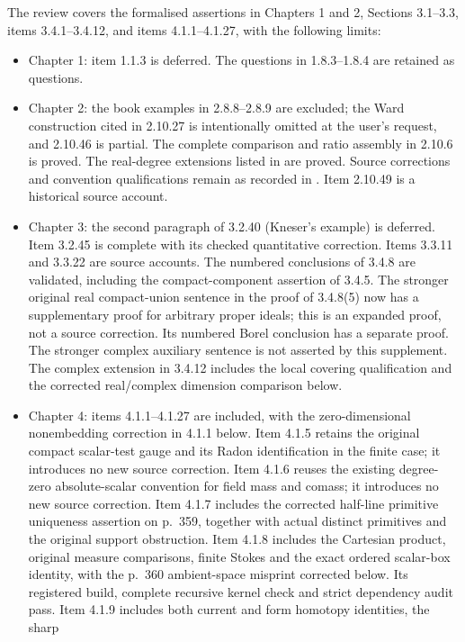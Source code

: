 \documentclass[11pt]{article}
\begin{document}
The review covers the formalised assertions in Chapters 1 and 2,
Sections 3.1--3.3, items 3.4.1--3.4.12, and items 4.1.1--4.1.27, with the following limits:
\begin{itemize}
\item Chapter 1: item 1.1.3 is deferred. The questions in 1.8.3--1.8.4
are retained as questions.
\item Chapter 2: the book examples in 2.8.8--2.8.9 are excluded;
the Ward construction cited in 2.10.27 is intentionally omitted at the
user's request, and 2.10.46 is partial. The complete comparison and ratio assembly in 2.10.6 is proved. The real-degree extensions listed in
 are proved. Source corrections and
convention qualifications remain as recorded in
. Item 2.10.49 is a historical source account.
\item Chapter 3: the second paragraph of 3.2.40 (Kneser's example) is
deferred. Item 3.2.45 is complete with its checked quantitative
correction. Items 3.3.11 and 3.3.22 are source accounts. The numbered conclusions of 3.4.8 are validated, including
the compact-component assertion of 3.4.5. The stronger original real
compact-union sentence in the proof of 3.4.8(5) now has a supplementary
proof for arbitrary proper ideals; this is an expanded proof, not a source
correction. Its numbered Borel conclusion has a separate proof. The stronger
complex auxiliary sentence is not asserted by this supplement. The complex
extension in 3.4.12 includes the local covering qualification
and the corrected real/complex dimension comparison below.
\item Chapter 4: items 4.1.1--4.1.27 are included, with the
zero-dimensional nonembedding correction in 4.1.1 below.
Item 4.1.5 retains the original compact scalar-test gauge and its Radon
identification in the finite case; it introduces no new source correction.
Item 4.1.6 reuses the existing degree-zero absolute-scalar convention
for field mass and comass; it introduces no new source correction.
Item 4.1.7 includes the corrected half-line primitive uniqueness
assertion on p.~359, together with actual distinct primitives and the
original support obstruction.
Item 4.1.8 includes the Cartesian product, original measure comparisons,
finite Stokes and the exact ordered scalar-box identity, with the
p.~360 ambient-space misprint corrected below. Its registered build,
complete recursive kernel check and strict dependency audit pass.
Item 4.1.9 includes both current and form homotopy identities, the sharp

\end{itemize}
\end{document}
